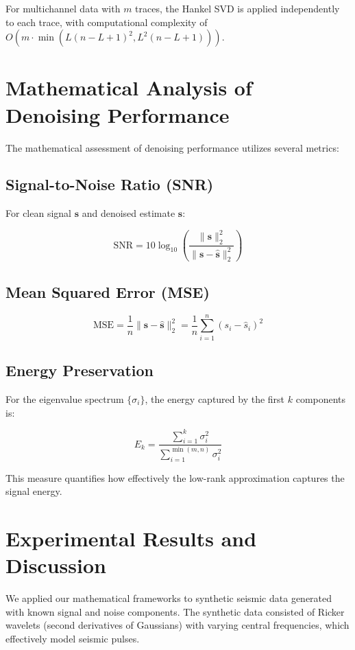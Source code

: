 \documentclass[11pt]{article}
\begin{document}
For multichannel data with $m$ traces, the Hankel SVD is applied independently to each trace, with computational complexity of $O(m \cdot \min(L(n-L+1)^2, L^2(n-L+1)))$.

\section{Mathematical Analysis of Denoising Performance}
The mathematical assessment of denoising performance utilizes several metrics:

\subsection{Signal-to-Noise Ratio (SNR)}
For clean signal $\mathbf{s}$ and denoised estimate $\mathbf{\hat{s}}$:

\begin{equation}
\text{SNR} = 10 \log_{10} \left( \frac{\|\mathbf{s}\|_2^2}{\|\mathbf{s} - \mathbf{\hat{s}}\|_2^2} \right)
\end{equation}

\subsection{Mean Squared Error (MSE)}
\begin{equation}
\text{MSE} = \frac{1}{n} \|\mathbf{s} - \mathbf{\hat{s}}\|_2^2 = \frac{1}{n} \sum_{i=1}^{n} (s_i - \hat{s}_i)^2
\end{equation}

\subsection{Energy Preservation}
For the eigenvalue spectrum $\{\sigma_i\}$, the energy captured by the first $k$ components is:

\begin{equation}
E_k = \frac{\sum_{i=1}^{k} \sigma_i^2}{\sum_{i=1}^{\min(m,n)} \sigma_i^2}
\end{equation}

This measure quantifies how effectively the low-rank approximation captures the signal energy.

\section{Experimental Results and Discussion}
We applied our mathematical frameworks to synthetic seismic data generated with known signal and noise components. The synthetic data consisted of Ricker wavelets (second derivatives of Gaussians) with varying central frequencies, which effectively model seismic pulses.
\end{document}
